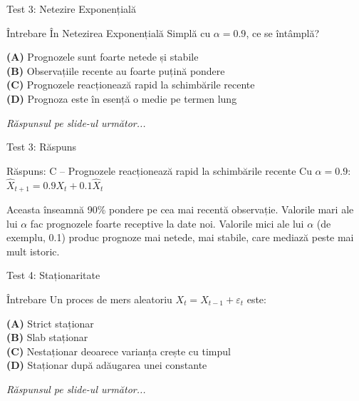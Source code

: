 \documentclass[9pt, aspectratio=169, t]{beamer}
\begin{document}
\begin{frame}{Test 3: Netezire Exponențială}
    \begin{alertblock}{Întrebare}
        În Netezirea Exponențială Simplă cu $\alpha = 0.9$, ce se întâmplă?
    \end{alertblock}

    \vspace{0.4cm}

    \textcolor{MainBlue}{\textbf{(A)}} Prognozele sunt foarte netede și stabile\\[3pt]
    \textcolor{MainBlue}{\textbf{(B)}} Observațiile recente au foarte puțină pondere\\[3pt]
    \textcolor{MainBlue}{\textbf{(C)}} Prognozele reacționează rapid la schimbările recente\\[3pt]
    \textcolor{MainBlue}{\textbf{(D)}} Prognoza este în esență o medie pe termen lung

    \vspace{0.5cm}

    \begin{center}
        \textit{Răspunsul pe slide-ul următor...}
    \end{center}
\end{frame}

\begin{frame}{Test 3: Răspuns}
    \begin{exampleblock}{Răspuns: C -- Prognozele reacționează rapid la schimbările recente}
        Cu $\alpha = 0.9$: $\hat{X}_{t+1} = 0.9 X_t + 0.1 \hat{X}_t$

        Aceasta înseamnă 90\% pondere pe cea mai recentă observație. Valorile mari ale lui $\alpha$ fac prognozele foarte receptive la date noi. Valorile mici ale lui $\alpha$ (de exemplu, 0.1) produc prognoze mai netede, mai stabile, care mediază peste mai mult istoric.
    \end{exampleblock}
\end{frame}

\begin{frame}{Test 4: Staționaritate}
    \begin{alertblock}{Întrebare}
        Un proces de mers aleatoriu $X_t = X_{t-1} + \varepsilon_t$ este:
    \end{alertblock}

    \vspace{0.4cm}

    \textcolor{MainBlue}{\textbf{(A)}} Strict staționar\\[3pt]
    \textcolor{MainBlue}{\textbf{(B)}} Slab staționar\\[3pt]
    \textcolor{MainBlue}{\textbf{(C)}} Nestaționar deoarece varianța crește cu timpul\\[3pt]
    \textcolor{MainBlue}{\textbf{(D)}} Staționar după adăugarea unei constante

    \vspace{0.5cm}

    \begin{center}
        \textit{Răspunsul pe slide-ul următor...}
    \end{center}
\end{frame}
\end{document}

